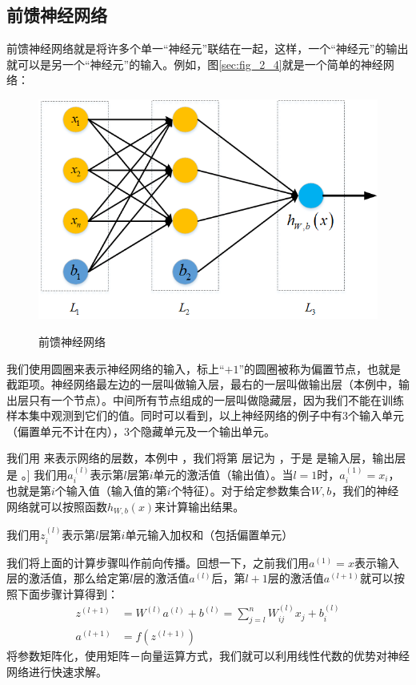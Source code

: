 \subsection{前馈神经网络}
前馈神经网络就是将许多个单一“神经元”联结在一起，这样，一个“神经元”的输出就可以是另一个“神经元”的输入。例如，图\ref{sec:fig_2_4}就是一个简单的神经网络：\par
\begin{figure}
	\centering
	\includegraphics[scale=0.8]{figures/chapter_2/fig_2_4}\label{sec:fig_2_4}
	\caption{前馈神经网络}\label{fig_2_3}
\end{figure}
我们使用圆圈来表示神经网络的输入，标上“$+1$”的圆圈被称为偏置节点，也就是截距项。神经网络最左边的一层叫做输入层，最右的一层叫做输出层（本例中，输出层只有一个节点）。中间所有节点组成的一层叫做隐藏层，因为我们不能在训练样本集中观测到它们的值。同时可以看到，以上神经网络的例子中有3个输入单元（偏置单元不计在内），3个隐藏单元及一个输出单元。\par

 我们用 来表示网络的层数，本例中 ，我们将第 层记为 ，于是 是输入层，输出层是 。] 我们用$a^{(l)}_i$表示第$l$层第$i$单元的激活值（输出值）。当$l=1$时，$a^{(1)}_i = x_i$，也就是第$i$个输入值（输入值的第$i$个特征）。对于给定参数集合$W,b$，我们的神经网络就可以按照函数$h_{W,b}(x)$来计算输出结果。\par
 
我们用$z^{(l)}_i$表示第$l$层第$i$单元输入加权和（包括偏置单元）

我们将上面的计算步骤叫作前向传播。回想一下，之前我们用$a^{(1)} = x$表示输入层的激活值，那么给定第$l$层的激活值$a^{(l)}$后，第$l+1$层的激活值$a^{(l+1)}$就可以按照下面步骤计算得到：
\begin{align}
	z^{(l+1)} &= W^{(l)} a^{(l)} + b^{(l)}=\sum_{j=l}^n W^{(l)}_{ij} x_j + b^{(l)}_i\\
	a^{(l+1)} &= f(z^{(l+1)})
\end{align}
将参数矩阵化，使用矩阵－向量运算方式，我们就可以利用线性代数的优势对神经网络进行快速求解。\par

